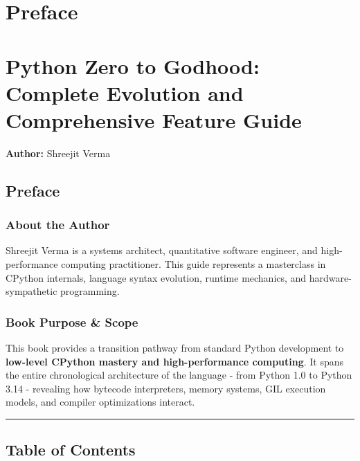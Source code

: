 \hypertarget{preface}{%
\chapter{Preface}\label{preface}}

\hypertarget{python-zero-to-godhood-complete-evolution-and-comprehensive-feature-guide}{%
\chapter{Python Zero to Godhood: Complete Evolution and Comprehensive
Feature
Guide}\label{python-zero-to-godhood-complete-evolution-and-comprehensive-feature-guide}}

\textbf{Author:} Shreejit Verma

\hypertarget{preface-1}{%
\section{Preface}\label{preface-1}}

\hypertarget{about-the-author}{%
\subsection{About the Author}\label{about-the-author}}

Shreejit Verma is a systems architect, quantitative software engineer,
and high-performance computing practitioner. This guide represents a
masterclass in CPython internals, language syntax evolution, runtime
mechanics, and hardware-sympathetic programming.

\hypertarget{book-purpose-scope}{%
\subsection{Book Purpose \& Scope}\label{book-purpose-scope}}

This book provides a transition pathway from standard Python development
to \textbf{low-level CPython mastery and high-performance computing}. It
spans the entire chronological architecture of the language - from Python
1.0 to Python 3.14 - revealing how bytecode interpreters, memory systems,
GIL execution models, and compiler optimizations interact.

\begin{center}\rule{0.5\linewidth}{0.5pt}\end{center}

\hypertarget{table-of-contents}{%
\section{Table of Contents}\label{table-of-contents}}

